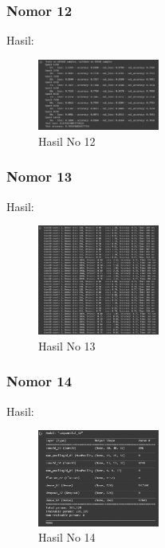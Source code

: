 \subsubsection{Nomor 12}
\hfill\break

Hasil:
\begin{figure}[H]
\centering
	\includegraphics[width=4cm]{figures/1174067/7/no12.jpg}
	\caption{Hasil No 12}
\end{figure}

\subsubsection{Nomor 13}
\hfill\break

Hasil:
\begin{figure}[H]
\centering
	\includegraphics[width=4cm]{figures/1174067/7/no13.jpg}
	\caption{Hasil No 13}
\end{figure}

\subsubsection{Nomor 14}
\hfill\break

Hasil:
\begin{figure}[H]
\centering
	\includegraphics[width=4cm]{figures/1174067/7/no14.jpg}
	\caption{Hasil No 14}
\end{figure}

